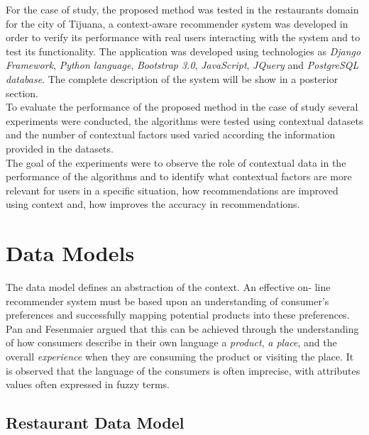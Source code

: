 For the case of study, the proposed method was tested in the restaurants
domain for the city of Tijuana, a context-aware recommender system 
was developed 
in order to verify its performance with real users interacting with 
the system and to
test  its functionality.  The application was developed using
technologies as \textit{Django Framework}, \textit{Python language}, 
\textit{Bootstrap 3.0},
\textit{JavaScript}, \textit{JQuery} and  \textit{PostgreSQL database}. 
The complete description of the system will be show in a posterior section.\\ 
To evaluate the performance of the proposed method in
the case of study several experiments were conducted, the algorithms
were tested using  contextual datasets and the number of contextual
factors used varied  according the information provided in the
datasets. \\ The goal of the  experiments were to observe the role of
contextual data  in the performance of the algorithms and to
identify what contextual factors are more relevant for users in a
specific situation, how recommendations are improved using context
and, how improves the accuracy in recommendations.

\section{Data Models}

The data model defines an abstraction of the context. An effective on-
line  recommender system must be based upon an understanding of
consumer's  preferences and successfully mapping potential products
into these preferences\cite{adomavicius2011context}. Pan and
Fesenmaier\cite{pan2006online} argued that this can be achieved
through the understanding of  how consumers describe in their own
language a \textit{product}, \textit{a place}, and the overall
\textit{experience}  when they are consuming the product or visiting
the place.  It is observed that  the language of the consumers is
often imprecise,  with attributes values often expressed in fuzzy
terms. 

\subsection{Restaurant Data Model}

